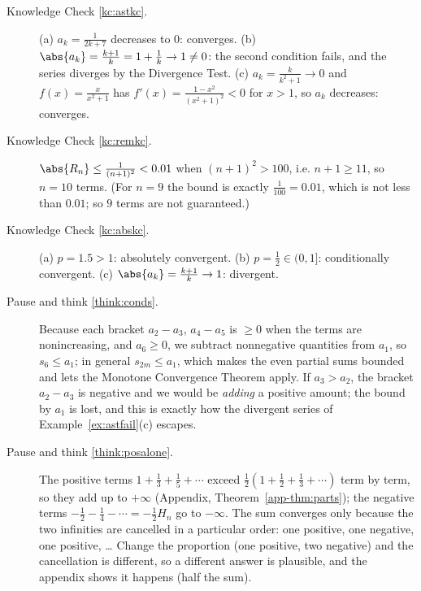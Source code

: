 \documentclass[11pt]{article}
\begin{document}
\begin{description}
  \item[Knowledge Check \ref{kc:astkc}.] (a) $a_k=\frac1{2k+7}$ decreases to $0$: converges. (b) $\abs{a_k}=\frac{k+1}k=1+\frac1k\to1\ne0$: the second condition fails, and the series diverges by the Divergence Test. (c) $a_k=\frac k{k^2+1}\to0$ and $f(x)=\frac x{x^2+1}$ has $f'(x)=\frac{1-x^2}{(x^2+1)^2}<0$ for $x>1$, so $a_k$ decreases: converges.
  \item[Knowledge Check \ref{kc:remkc}.] $\abs{R_n}\le\frac1{(n+1)^2}<0.01$ when $(n+1)^2>100$, i.e. $n+1\ge11$, so $n=10$ terms. (For $n=9$ the bound is exactly $\frac1{100}=0.01$, which is not less than $0.01$; so $9$ terms are not guaranteed.)
  \item[Knowledge Check \ref{kc:abskc}.] (a) $p=1.5>1$: absolutely convergent. (b) $p=\frac12\in(0,1]$: conditionally convergent. (c) $\abs{a_k}=\frac{k+1}k\to1$: divergent.
  \item[Pause and think \ref{think:conds}.] Because each bracket $a_2-a_3$, $a_4-a_5$ is $\ge0$ when the terms are nonincreasing, and $a_6\ge0$, we subtract nonnegative quantities from $a_1$, so $s_6\le a_1$; in general $s_{2m}\le a_1$, which makes the even partial sums bounded and lets the Monotone Convergence Theorem apply. If $a_3>a_2$, the bracket $a_2-a_3$ is negative and we would be \emph{adding} a positive amount; the bound by $a_1$ is lost, and this is exactly how the divergent series of Example~\ref{ex:astfail}(c) escapes.
  \item[Pause and think \ref{think:posalone}.] The positive terms $1+\frac13+\frac15+\cdots$ exceed $\frac12\left(1+\frac12+\frac13+\cdots\right)$ term by term, so they add up to $+\infty$ (Appendix, Theorem~\ref{app-thm:parts}); the negative terms $-\frac12-\frac14-\cdots=-\frac12H_n$ go to $-\infty$. The sum converges only because the two infinities are cancelled in a particular order: one positive, one negative, one positive, \dots{} Change the proportion (one positive, two negative) and the cancellation is different, so a different answer is plausible, and the appendix shows it happens (half the sum).

\end{description}
\end{document}
